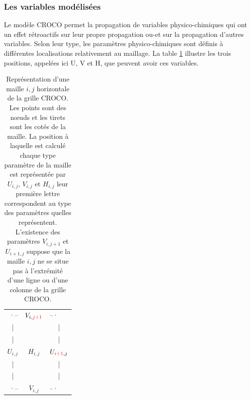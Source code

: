 \documentclass[10pt,a4paper,titlepage]{article}
\begin{document}

\subsubsection{Les variables modélisées}
\label{subsub:variables_modelisees}
Le modèle CROCO permet la propagation de variables physico-chimiques qui ont un effet rétroactifs sur leur propre propagation ou-et sur la propagation d'autres variables.
Selon leur type, les paramètres physico-chimiques sont définis à différentes localisations relativement au maillage.
La table \ref{structure_maille horizontale} %
illustre les trois positions, appelées ici U, V et H, que peuvent avoir ces variables.

\begin{table}
    \centering
    \begin{tabular}{ c c c }
        \multicolumn{1}{r}{·--} & $V_{i,{\color{red}j+1}}$ & \multicolumn{1}{l}{--·} \\
        | & & | \\
        | & & | \\
        $U_{i,j}$ & $H_{i,j}$ & $U_{{\color{red}i+1},j}$ \\
        | & & | \\
        | & & | \\
        \multicolumn{1}{r}{·--} & \textbf{$V_{i,j}$} & \multicolumn{1}{l}{--·}
    \end{tabular}
    \caption{Représentation d'une maille $i,j$ horizontale de la grille CROCO.
        Les points sont des nœuds et les tirets sont les cotés de la maille.
        La position à laquelle est calculé chaque type paramètre de la maille est représentée par $U_{i,j}$, $V_{i,j}$ et $H_{i,j}$ leur première lettre correspondent au type des paramètres quelles représentent.
        L'existence des paramètres $V_{i,j+1}$ et $U_{i+1,j}$ suppose que la maille $i,j$ ne se situe pas à l'extrémité d'une ligne ou d'une colonne de la grille CROCO.
    }
    \label{structure_maille horizontale}
\end{table}
\end{document}
